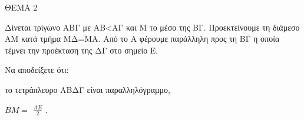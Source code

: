 
ΘΕΜΑ 2

Δίνεται τρίγωνο ΑΒΓ με ΑΒ\textless ΑΓ και Μ το μέσο της ΒΓ. Προεκτείνουμε τη διάμεσο ΑΜ κατά τμήμα ΜΔ=ΜΑ. Από το Α φέρουμε παράλληλη προς τη ΒΓ η οποία τέμνει την προέκταση της ΔΓ στο σημείο Ε.

Να αποδείξετε ότι:

\begin{alist}
\item το τετράπλευρο ΑΒΔΓ είναι παραλληλόγραμμο, 

\item $ΒΜ =$ $\frac{ΑΕ}{2}$ . 
\end{alist}
